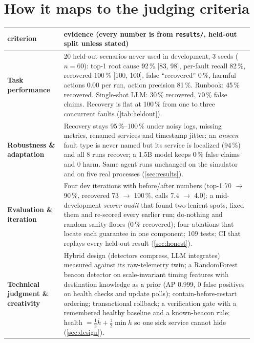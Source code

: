 \documentclass[11pt,a4paper]{article}
\newcommand{\code}[1]{\texttt{#1}}
\newcommand{\pct}[1]{#1\,\%}
\begin{document}
\section{How it maps to the judging criteria}

\begin{table}[H]
\centering\footnotesize
\renewcommand{\arraystretch}{1.15}
\begin{tabularx}{\textwidth}{>{\bfseries\color{accent}}p{3.1cm} X}
\toprule
criterion & evidence (every number is from \code{results/}, held-out split unless stated) \\
\midrule
Task performance & 20 held-out scenarios never used in development, 3 seeds ($n=60$): top-1 root cause \pct{92} [83, 98], per-fault recall \pct{82}, recovered \pct{100} [100, 100], false ``recovered'' \pct{0}, harmful actions 0.00 per run, action precision \pct{81}. Runbook: \pct{45} recovered. Single-shot LLM: \pct{30} recovered, \pct{70} false claims. Recovery is flat at \pct{100} from one to three concurrent faults (\cref{tab:heldout}). \\
Robustness \& adaptation & Recovery stays \pct{95}--\pct{100} under noisy logs, missing metrics, renamed services and timestamp jitter; an \emph{unseen} fault type is never named but its service is localized (\pct{94}) and all 8 runs recover; a 1.5B model keeps \pct{0} false claims and 0 harm. Same agent runs unchanged on the simulator and on five real processes (\cref{sec:results}). \\
Evaluation \& iteration & Four dev iterations with before/after numbers (top-1 70 $\to$ 90\,\%, recovered 73 $\to$ 100\,\%, calls 7.4 $\to$ 4.0); a mid-development \emph{scorer audit} that found two lenient spots, fixed them and re-scored every earlier run; do-nothing and random sanity floors (\pct{0} recovered); four ablations that locate each guarantee in one component; 109 tests; CI that replays every held-out result (\cref{sec:honest}). \\
Technical judgment \& creativity & Hybrid design (detectors compress, LLM integrates) measured against its raw-telemetry twin; a RandomForest beacon detector on scale-invariant timing features with destination knowledge as a prior (AP 0.999, 0 false positives on health checks and update polls); contain-before-restart ordering; transactional rollback; a verification gate with a remembered healthy baseline and a known-beacon rule; health $=\tfrac12\overline{h}+\tfrac12\min h$ so one sick service cannot hide (\cref{sec:design}). \\

\end{tabularx}
\end{table}
\end{document}
